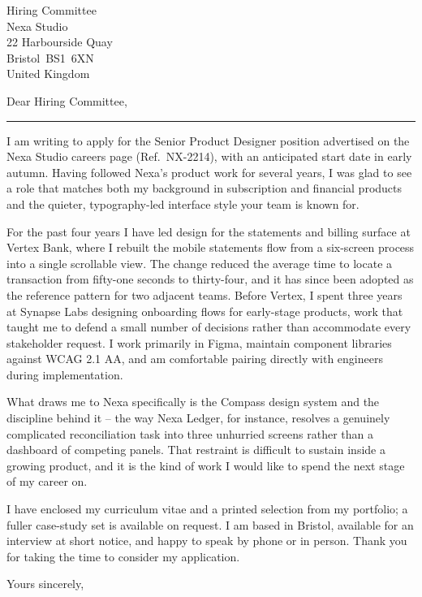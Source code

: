\documentclass[
  paper=a4,
  fontsize=11pt,
  DIV=11,
  parskip=half,
  fromalign=right,
  fromphone=true,
  fromemail=true,
  fromlogo=true,
  addrfield=true,
  backaddress=false,
  foldmarks=false,
  footsepline=false,
  headsepline=false,
  version=last
]{scrlttr2}
\newcommand{\divider}{%
  \par\vspace{2pt}%
  \noindent\textcolor{fog}{\rule{\linewidth}{0.4pt}}%
  \par\vspace{7pt}%
}
\begin{document}
\color{ink}

\begin{letter}{Hiring Committee\\Nexa Studio\\22 Harbourside Quay\\Bristol~BS1~6XN\\United Kingdom}


\opening{Dear Hiring Committee,}

\divider

I am writing to apply for the Senior Product Designer position advertised on the Nexa Studio careers page (Ref.\ NX-2214), with an anticipated start date in early autumn. Having followed Nexa's product work for several years, I was glad to see a role that matches both my background in subscription and financial products and the quieter, typography-led interface style your team is known for.

For the past four years I have led design for the statements and billing surface at Vertex Bank, where I rebuilt the mobile statements flow from a six-screen process into a single scrollable view. The change reduced the average time to locate a transaction from fifty-one seconds to thirty-four, and it has since been adopted as the reference pattern for two adjacent teams. Before Vertex, I spent three years at Synapse Labs designing onboarding flows for early-stage products, work that taught me to defend a small number of decisions rather than accommodate every stakeholder request. I work primarily in Figma, maintain component libraries against WCAG 2.1 AA, and am comfortable pairing directly with engineers during implementation.

What draws me to Nexa specifically is the Compass design system and the discipline behind it -- the way Nexa Ledger, for instance, resolves a genuinely complicated reconciliation task into three unhurried screens rather than a dashboard of competing panels. That restraint is difficult to sustain inside a growing product, and it is the kind of work I would like to spend the next stage of my career on.

I have enclosed my curriculum vitae and a printed selection from my portfolio; a fuller case-study set is available on request. I am based in Bristol, available for an interview at short notice, and happy to speak by phone or in person. Thank you for taking the time to consider my application.

\closing{Yours sincerely,}


\end{letter}
\end{document}
